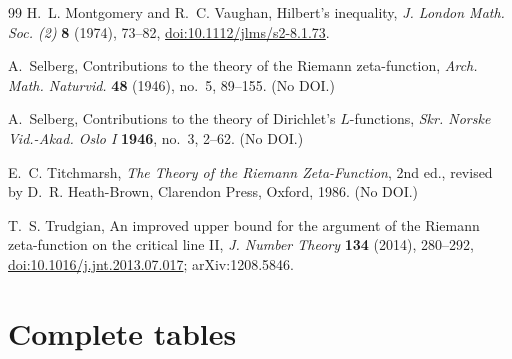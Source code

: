 \documentclass[11pt,reqno]{amsart}
\numberwithin{equation}{section}
\theoremstyle{plain}
\theoremstyle{definition}
\theoremstyle{remark}
\begin{document}
\begin{thebibliography}{99}
H.~L. Montgomery and R.~C. Vaughan, Hilbert's inequality, \emph{J. London Math. Soc. (2)} \textbf{8} (1974), 73--82, \href{https://doi.org/10.1112/jlms/s2-8.1.73}{doi:10.1112/jlms/s2-8.1.73}.

A.~Selberg, Contributions to the theory of the Riemann zeta-function, \emph{Arch. Math. Naturvid.} \textbf{48} (1946), no.~5, 89--155. (No DOI.)

A.~Selberg, Contributions to the theory of Dirichlet's $L$-functions, \emph{Skr. Norske Vid.-Akad. Oslo I} \textbf{1946}, no.~3, 2--62. (No DOI.)

E.~C. Titchmarsh, \emph{The Theory of the Riemann Zeta-Function}, 2nd ed., revised by D.~R. Heath-Brown, Clarendon Press, Oxford, 1986. (No DOI.)

T.~S. Trudgian, An improved upper bound for the argument of the Riemann zeta-function on the critical line II, \emph{J. Number Theory} \textbf{134} (2014), 280--292, \href{https://doi.org/10.1016/j.jnt.2013.07.017}{doi:10.1016/j.jnt.2013.07.017}; arXiv:1208.5846.

\end{thebibliography}
\clearpage

\appendix

\section{Complete tables}
\label{sec:appendix_tables}
\end{document}
